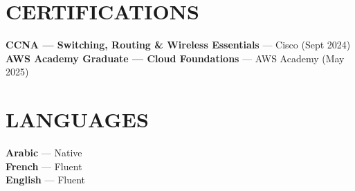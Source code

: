 \documentclass[10pt,a4paper]{article}
\begin{document}
\vspace{1pt}
\begin{minipage}[t]{0.70\textwidth}
\section{CERTIFICATIONS}
{\small
\textbf{\color{primary}CCNA — Switching, Routing \& Wireless Essentials} — Cisco (Sept 2024)\\[1pt]
\textbf{\color{primary}AWS Academy Graduate — Cloud Foundations} — AWS Academy (May 2025)
}
\end{minipage}%
\hfill
\begin{minipage}[t]{0.26\textwidth}
\section{LANGUAGES}
{\small\textbf{Arabic} — Native}\\[1pt]
{\small\textbf{French} — Fluent}\\[1pt]
{\small\textbf{English} — Fluent}
\end{minipage}
\end{document}
